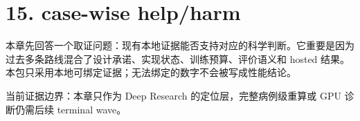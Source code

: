 \section{15. case-wise help/harm}

本章先回答一个取证问题：现有本地证据能否支持对应的科学判断。它重要是因为过去多条路线混合了设计承诺、实现状态、训练预算、评价语义和 hosted 结果。本包只采用本地可绑定证据；无法绑定的数字不会被写成性能结论。



当前证据边界：本章只作为 Deep Research 的定位层，完整病例级重算或 GPU 诊断仍需后续 terminal wave。



\clearpage